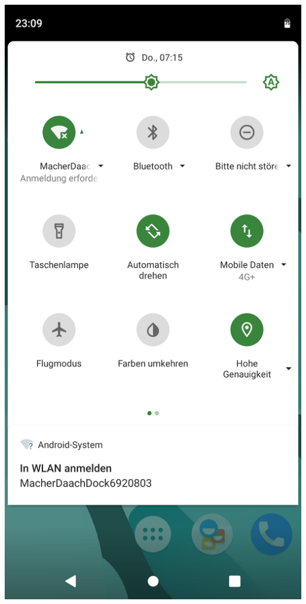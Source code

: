 \documentclass{article}
\begin{document}
\begin{minipage}[b]{0.5\textwidth}
	\includegraphics[width=\textwidth]{Bilder2019/Screenshot_20190918-230930_Nova_Launcher.png}
\end{minipage}
\end{document}
